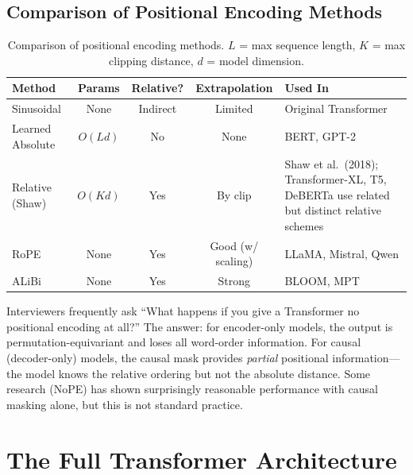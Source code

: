 \subsection{Comparison of Positional Encoding Methods}

\begin{table}[H]
\centering
\small
\begin{tabularx}{\textwidth}{@{}l c c c X@{}}
\toprule
\textbf{Method} & \textbf{Params} & \textbf{Relative?} & \textbf{Extrapolation} & \textbf{Used In} \\
\midrule
Sinusoidal         & None    & Indirect & Limited  & Original Transformer \\
Learned Absolute   & $O(Ld)$ & No       & None     & BERT, GPT-2 \\
Relative (Shaw)    & $O(Kd)$ & Yes      & By clip  & Shaw et al.\ (2018); Transformer-XL, T5, DeBERTa use related but distinct relative schemes \\
RoPE               & None    & Yes      & Good (w/ scaling) & LLaMA, Mistral, Qwen \\
ALiBi              & None    & Yes      & Strong   & BLOOM, MPT \\
\bottomrule
\end{tabularx}
\caption{Comparison of positional encoding methods.  $L$ = max sequence length,
$K$ = max clipping distance, $d$ = model dimension.}
\label{tab:pos-encoding}
\end{table}

\begin{warningbox}
Interviewers frequently ask ``What happens if you give a Transformer no
positional encoding at all?''  The answer: for encoder-only models, the output
is permutation-equivariant and loses all word-order information.  For
causal (decoder-only) models, the causal mask provides \emph{partial}
positional information---the model knows the relative ordering but not the
absolute distance.  Some research (NoPE) has shown surprisingly reasonable
performance with causal masking alone, but this is not standard practice.
\end{warningbox}


\section{The Full Transformer Architecture}
\label{sec:full-arch}

